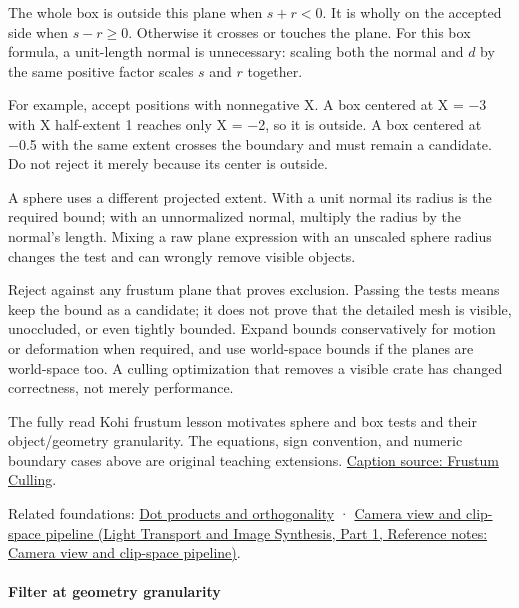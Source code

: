 The whole box is outside this plane when \(s+r<0\). It is wholly on the accepted side when \(s-r\geq0\). Otherwise it crosses or touches the plane. For this box formula, a unit-length normal is unnecessary: scaling both the normal and \(d\) by the same positive factor scales \(s\) and \(r\) together.

For example, accept positions with nonnegative X. A box centered at X = −3 with X half-extent 1 reaches only X = −2, so it is outside. A box centered at −0.5 with the same extent crosses the boundary and must remain a candidate. Do not reject it merely because its center is outside.

A sphere uses a different projected extent. With a unit normal its radius is the required bound; with an unnormalized normal, multiply the radius by the normal's length. Mixing a raw plane expression with an unscaled sphere radius changes the test and can wrongly remove visible objects.

Reject against any frustum plane that proves exclusion. Passing the tests means keep the bound as a candidate; it does not prove that the detailed mesh is visible, unoccluded, or even tightly bounded. Expand bounds conservatively for motion or deformation when required, and use world-space bounds if the planes are world-space too. A culling optimization that removes a visible crate has changed correctness, not merely performance.

The fully read Kohi frustum lesson motivates sphere and box tests and their object/geometry granularity. The equations, sign convention, and numeric boundary cases above are original teaching extensions. \href{https://www.youtube.com/watch?v=vJrfcI_bMTA}{Caption source: Frustum Culling}.

Related foundations: \hyperref[appendix-8bc4e8fc547c]{Dot products and orthogonality} · \href{../04-Light-Transport-and-Image-Synthesis-P01/main.pdf\#appendix-1c07d64f5e70}{Camera view and clip-space pipeline (Light Transport and Image Synthesis, Part 1, Reference notes: Camera view and clip-space pipeline)}.

\paragraph{Filter at geometry granularity}\label{06-engine-ii-ch026-filter-at-geometry-granularity}

\hypertarget{06-engine-ii-ch026-filter-at-geometry-granularity}{}

